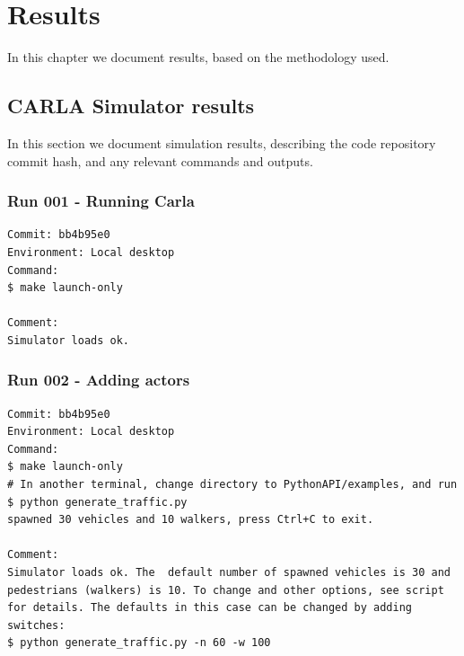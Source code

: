 \chapter{Results} %
\label{Appendix-results} %
In this chapter we document results, based on the methodology used.

\section{CARLA Simulator results}
In this section we document simulation results, describing the code repository commit hash, and any relevant commands and outputs.

\subsection{Run 001 - Running Carla}
\label{app_res:001}
\begin{verbatim}
Commit: bb4b95e0
Environment: Local desktop
Command:
$ make launch-only

Comment:
Simulator loads ok.

\end{verbatim}

\subsection{Run 002 - Adding actors}
\label{app_res:002}
\begin{verbatim}
Commit: bb4b95e0
Environment: Local desktop
Command:
$ make launch-only
# In another terminal, change directory to PythonAPI/examples, and run
$ python generate_traffic.py 
spawned 30 vehicles and 10 walkers, press Ctrl+C to exit.

Comment:
Simulator loads ok. The  default number of spawned vehicles is 30 and pedestrians (walkers) is 10. To change and other options, see script for details. The defaults in this case can be changed by adding switches:
$ python generate_traffic.py -n 60 -w 100
\end{verbatim}

